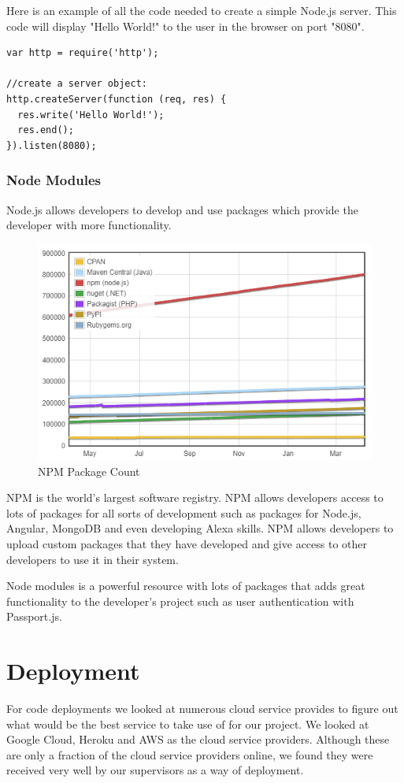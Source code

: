 Here is an example of all the code needed to create a simple Node.js server. This code will display "Hello World!" to the user in the browser on port "8080".
\begin{verbatim}
var http = require('http');

//create a server object:
http.createServer(function (req, res) {
  res.write('Hello World!');
  res.end();
}).listen(8080);
\end{verbatim}

\subsubsection{Node Modules}
Node.js allows developers to develop and use packages which provide the developer with more functionality.

\begin{figure}[H]
  \includegraphics[width=\linewidth]{img/moduleCount.PNG}
  \caption{NPM Package Count}
  \label{fig:NPM}
\end{figure}

NPM is the world’s largest software registry. NPM allows developers access to lots of packages for all sorts of development such as packages for Node.js, Angular, MongoDB and even developing Alexa skills. NPM allows developers to upload custom packages that they have developed and give access to other developers to use it in their system.

Node modules is a powerful resource with lots of packages that adds great functionality to the developer's project such as user authentication with Passport.js.

\section{Deployment}
For code deployments we looked at numerous cloud service provides to figure out what would be the best service to take use of for our project. We looked at Google Cloud, Heroku and AWS as the cloud service providers. Although these are only a fraction of the cloud service providers online, we found they were received very well by our supervisors as a way of deployment. 

